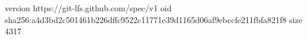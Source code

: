 version https://git-lfs.github.com/spec/v1
oid sha256:a4d3bd2c501461b226dffc9522c11771e39d1165d06af9ebccfe211fbfa821f8
size 4317
